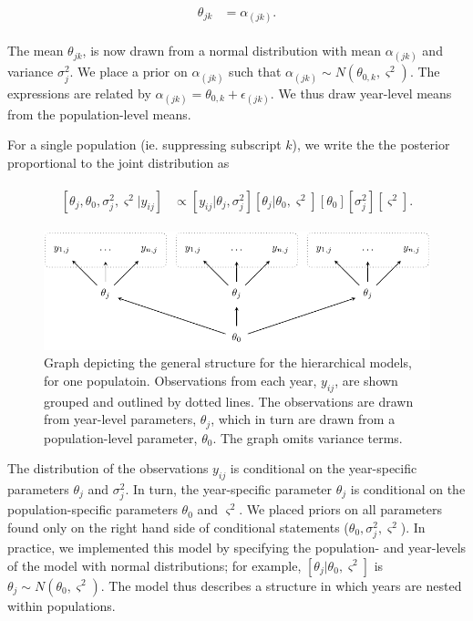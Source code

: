 \documentclass[12pt, oneside, titlepage]{article}   	%
\begin{document}
\begin{align}
  \begin{split}
  \theta_{jk} &  = \alpha_{(jk)}.
  \end{split}
\end{align}

The mean $\theta_{jk}$, is now drawn from a normal distribution with mean $\alpha_{(jk)}$ and variance $\sigma^2_j$. We place a prior on $\alpha_{(jk)}$ such that $\alpha_{(jk)}\sim N(\theta_{0,k}, \varsigma^2)$. The expressions are related by $\alpha_{(jk)}=\theta_{0,k}+\epsilon_{(jk)}$. We thus draw year-level means from the population-level means. 

For a single population (ie. suppressing subscript $k$), we write the the posterior proportional to the joint distribution as

\begin{align}
  \begin{split}
  [ \theta_j , \theta_0 , \sigma_j^2 , \varsigma^2 | y_{ij} ] &  \propto [ y_{ij} | \theta_j , \sigma^2_j] [ \theta_j | \theta_0 , \varsigma^2 ] [ \theta_0 ] [ \sigma^2_j] [ \varsigma^2].
  \end{split}
\end{align}

\begin{figure}
       \includegraphics[scale=.65]{../../manuscript/figures/dag-partialpool.pdf}  
    \caption{ Graph depicting the general structure for the hierarchical models, for one populatoin. Observations from each year, $y_{ij}$, are shown grouped and outlined by dotted lines. The observations are drawn from year-level parameters, $\theta_j$, which in turn are drawn from a population-level parameter, $\theta_0$. The graph omits variance terms. }
 \label{fig:hierarchical-dag}
\end{figure}

The distribution of the observations $y_{ij}$ is conditional on the year-specific parameters $\theta_j$ and $\sigma^2_j$. In turn, the year-specific parameter $\theta_j$ is conditional on the population-specific parameters $\theta_0$ and $ \varsigma^2$. We placed priors on all parameters found only on the right hand side of conditional statements ($\theta_0, \sigma^2_j, \varsigma^2$). In practice, we implemented this model by specifying the population- and year-levels of the model with normal distributions; for example, $[ \theta_j | \theta_0 , \varsigma^2 ]$ is $\theta_j \sim N(\theta_0, \varsigma^2)$. The model thus describes a structure in which years are nested within populations.
\end{document}
